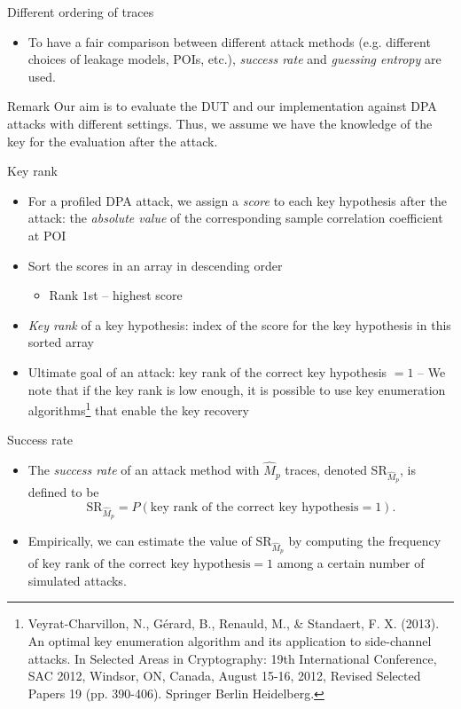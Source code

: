 \begin{frame}{Different ordering of traces}
    \begin{itemize}
        \item To have a fair comparison between different attack methods (e.g. different choices of leakage models, POIs, etc.), \textit{success rate} and \textit{guessing entropy} are used.
    \end{itemize}
    \begin{alertblock}{Remark}
    Our aim is to evaluate the DUT and our implementation against DPA attacks with different settings.
    Thus, we assume we have the knowledge of the key for the evaluation after the attack.
    \end{alertblock}
\end{frame}

\begin{frame}{Key rank}
    \begin{itemize}
        \item For a profiled DPA attack, we assign a \textit{score} to each key hypothesis after the attack: the \textit{absolute value} of the corresponding sample correlation coefficient at POI
        \item Sort the scores in an array in descending order
        \begin{itemize}
            \item Rank $1$st -- highest score
        \end{itemize}
        \item \textit{Key rank} of a key hypothesis: index of the score for the key hypothesis in this sorted array
        \item Ultimate goal of an attack: key rank of the correct key hypothesis $=1$ -- We note that if the key rank is low enough, it is possible to use key enumeration algorithms\footnote{Veyrat-Charvillon, N., Gérard, B., Renauld, M., \& Standaert, F. X. (2013). An optimal key enumeration algorithm and its application to side-channel attacks. In Selected Areas in Cryptography: 19th International Conference, SAC 2012, Windsor, ON, Canada, August 15-16, 2012, Revised Selected Papers 19 (pp. 390-406). Springer Berlin Heidelberg.} that enable the key recovery
        \end{itemize}
\end{frame}

\begin{frame}{Success rate}
    \begin{itemize}
        \item The \textit{success rate} of an attack method with $\hat{M}_p$ traces, denoted SR$_{\hat{M}_p}$, is defined to be 
        \begin{equation*}
       \text{SR}_{\hat{M}_p}=P\left(\text{key rank of the correct key hypothesis}=1\right).
     \end{equation*}
        \item Empirically, we can estimate the value of $\text{SR}_{\hat{M}_p}$ by computing the frequency of $\text{key rank of the correct key hypothesis}=1$ among a certain number of simulated attacks.
    \end{itemize}
\end{frame}

